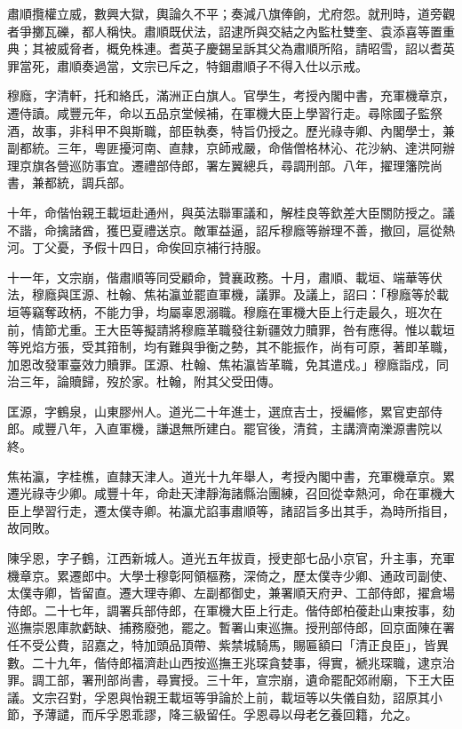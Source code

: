 \begin{pinyinscope}
肅順攬權立威，數興大獄，輿論久不平；奏減八旗俸餉，尤府怨。就刑時，道旁觀者爭擲瓦礫，都人稱快。肅順既伏法，詔逮所與交結之內監杜雙奎、袁添喜等置重典；其被威脅者，概免株連。耆英子慶錫呈訴其父為肅順所陷，請昭雪，詔以耆英罪當死，肅順奏過當，文宗已斥之，特錮肅順子不得入仕以示戒。

穆廕，字清軒，托和絡氏，滿洲正白旗人。官學生，考授內閣中書，充軍機章京，遷侍讀。咸豐元年，命以五品京堂候補，在軍機大臣上學習行走。尋除國子監祭酒，故事，非科甲不與斯職，部臣執奏，特旨仍授之。歷光祿寺卿、內閣學士，兼副都統。三年，粵匪擾河南、直隸，京師戒嚴，命偕僧格林沁、花沙納、達洪阿辦理京旗各營巡防事宜。遷禮部侍郎，署左翼總兵，尋調刑部。八年，擢理籓院尚書，兼都統，調兵部。

十年，命偕怡親王載垣赴通州，與英法聯軍議和，解桂良等欽差大臣關防授之。議不諧，命擒諸酋，獲巴夏禮送京。敵軍益逼，詔斥穆廕等辦理不善，撤回，扈從熱河。丁父憂，予假十四日，命俟回京補行持服。

十一年，文宗崩，偕肅順等同受顧命，贊襄政務。十月，肅順、載垣、端華等伏法，穆廕與匡源、杜翰、焦祐瀛並罷直軍機，議罪。及議上，詔曰：「穆廕等於載垣等竊奪政柄，不能力爭，均屬辜恩溺職。穆廕在軍機大臣上行走最久，班次在前，情節尤重。王大臣等擬請將穆廕革職發往新疆效力贖罪，咎有應得。惟以載垣等兇焰方張，受其箝制，均有難與爭衡之勢，其不能振作，尚有可原，著即革職，加恩改發軍臺效力贖罪。匡源、杜翰、焦祐瀛皆革職，免其遣戍。」穆廕詣戍，同治三年，論贖歸，歿於家。杜翰，附其父受田傳。

匡源，字鶴泉，山東膠州人。道光二十年進士，選庶吉士，授編修，累官吏部侍郎。咸豐八年，入直軍機，謙退無所建白。罷官後，清貧，主講濟南濼源書院以終。

焦祐瀛，字桂樵，直隸天津人。道光十九年舉人，考授內閣中書，充軍機章京。累遷光祿寺少卿。咸豐十年，命赴天津靜海諸縣治團練，召回從幸熱河，命在軍機大臣上學習行走，遷太僕寺卿。祐瀛尤諂事肅順等，諸詔旨多出其手，為時所指目，故同敗。

陳孚恩，字子鶴，江西新城人。道光五年拔貢，授吏部七品小京官，升主事，充軍機章京。累遷郎中。大學士穆彰阿領樞務，深倚之，歷太僕寺少卿、通政司副使、太僕寺卿，皆留直。遷大理寺卿、左副都御史，兼署順天府尹、工部侍郎，擢倉場侍郎。二十七年，調署兵部侍郎，在軍機大臣上行走。偕侍郎柏葰赴山東按事，劾巡撫崇恩庫款虧缺、捕務廢弛，罷之。暫署山東巡撫。授刑部侍郎，回京面陳在署任不受公費，詔嘉之，特加頭品頂帶、紫禁城騎馬，賜匾額曰「清正良臣」，皆異數。二十九年，偕侍郎福濟赴山西按巡撫王兆琛貪婪事，得實，褫兆琛職，逮京治罪。調工部，署刑部尚書，尋實授。三十年，宣宗崩，遺命罷配郊祔廟，下王大臣議。文宗召對，孚恩與怡親王載垣等爭論於上前，載垣等以失儀自劾，詔原其小節，予薄譴，而斥孚恩乖謬，降三級留任。孚恩尋以母老乞養回籍，允之。


\end{pinyinscope}
